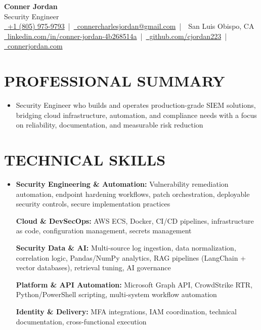 \documentclass[letterpaper,10pt]{article}
\newcommand{\resumeSubHeadingListStart}{\begin{itemize}[leftmargin=0in,label={}]}
\newcommand{\resumeSubHeadingListEnd}{\end{itemize}}
\begin{document}
\begin{center}
  {\Huge \textbf{Conner Jordan}}\\[0pt]
  {\Large Security Engineer}\\[0pt]
  \href{tel:+18059759793}{\faPhone\ +1 (805) 975-9793} \,|\, 
  \href{mailto:connercharlesjordan@gmail.com}{\faEnvelope\ connercharlesjordan@gmail.com} \,|\, 
  \faMapMarker\ San Luis Obispo, CA \\[-2pt]
  \href{https://www.linkedin.com/in/conner-jordan-4b268514a/}{\faLinkedin\ linkedin.com/in/conner-jordan-4b268514a}
  \,|\, \href{https://github.com/cjordan223}{\faGithub\ github.com/cjordan223}
  \,|\, \href{https://connerjordan.com/}{\faGlobe\ connerjordan.com}
\end{center}

\vspace{4pt}

\section{PROFESSIONAL SUMMARY}
\vspace{8pt}
\resumeSubHeadingListStart
\item {\small
Security Engineer who builds and operates production-grade SIEM solutions, bridging cloud infrastructure, automation, and compliance needs with a focus on reliability, documentation, and measurable risk reduction}
\resumeSubHeadingListEnd
\vspace{6pt}

\section{TECHNICAL SKILLS}
\vspace{6pt}
\resumeSubHeadingListStart
\item {\small
\textbf{Security Engineering \& Automation:} Vulnerability remediation automation, endpoint hardening workflows, patch orchestration, deployable security controls, secure implementation practices

\vspace{3pt}
\textbf{Cloud \& DevSecOps:} AWS ECS, Docker, CI/CD pipelines, infrastructure as code, configuration management, secrets management

\vspace{3pt}
\textbf{Security Data \& AI:} Multi-source log ingestion, data normalization, correlation logic, Pandas/NumPy analytics, RAG pipelines (LangChain + vector databases), retrieval tuning, AI governance

\vspace{3pt}
\textbf{Platform \& API Automation:} Microsoft Graph API, CrowdStrike RTR, Python/PowerShell scripting, multi-system workflow automation

\vspace{3pt}
\textbf{Identity \& Delivery:} MFA integrations, IAM coordination, technical documentation, cross-functional execution
}
\resumeSubHeadingListEnd
\vspace{6pt}
\end{document}
